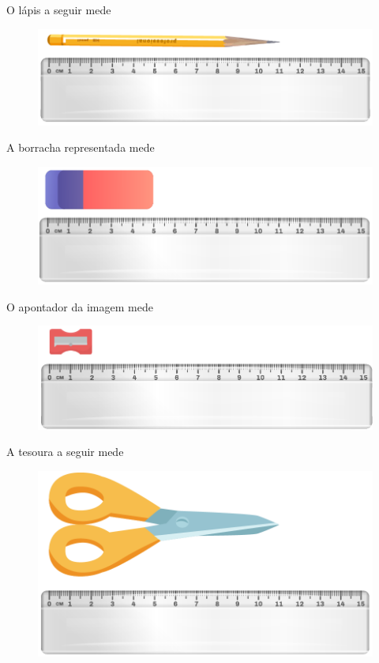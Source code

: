 \begin{escolha}
\item O lápis a seguir mede \reduline{11 cm\hfill}

\begin{figure}[htpb!]
\centering
\includegraphics[width=.6\textwidth]{../ilustracoes/MAT5/SAEB_5ANO_MAT_figura7.png}
\end{figure}

\pagebreak

\item A borracha representada mede \reduline{5 cm\hfill}

\begin{figure}[htpb!]
\centering
\includegraphics[width=.6\textwidth]{../ilustracoes/MAT5/SAEB_5ANO_MAT_figura8.png}
\end{figure}

\item O apontador da imagem mede \reduline{3 cm\hfill}

\begin{figure}[htpb!]
\centering
\includegraphics[width=.6\textwidth]{../ilustracoes/MAT5/SAEB_5ANO_MAT_figura9.png}
\end{figure}

\item A tesoura a seguir mede \reduline{10 cm\hfill}

\begin{figure}[htpb!]
\centering
\includegraphics[width=.6\textwidth]{../ilustracoes/MAT5/SAEB_5ANO_MAT_figura10.png}
\end{figure}

\end{escolha}


